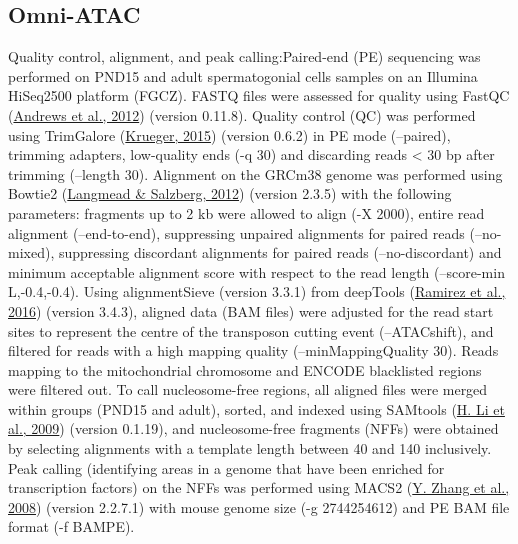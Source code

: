 \documentclass[12pt,twoside]{reedthesis}
\begin{document}
\hypertarget{omni-atac}{%
\subsection{Omni-ATAC}\label{omni-atac}}

Quality control, alignment, and peak calling:Paired-end (PE) sequencing
was performed on PND15 and adult spermatogonial cells samples on an
Illumina HiSeq2500 platform (FGCZ). FASTQ files were assessed for
quality using FastQC (\protect\hyperlink{ref-andrews2012}{Andrews et al., 2012}) (version 0.11.8). Quality control
(QC) was performed using TrimGalore (\protect\hyperlink{ref-krueger2015}{Krueger, 2015}) (version 0.6.2) in PE
mode (--paired), trimming adapters, low-quality ends (-q 30) and
discarding reads \textless{} 30 bp after trimming (--length 30). Alignment on the
GRCm38 genome was performed using Bowtie2 (\protect\hyperlink{ref-langmead2012}{Langmead \& Salzberg, 2012}) (version
2.3.5) with the following parameters: fragments up to 2 kb were allowed
to align (-X 2000), entire read alignment (--end-to-end), suppressing
unpaired alignments for paired reads (--no-mixed), suppressing
discordant alignments for paired reads (--no-discordant) and minimum
acceptable alignment score with respect to the read length (--score-min
L,-0.4,-0.4). Using alignmentSieve (version 3.3.1) from deepTools
(\protect\hyperlink{ref-ramirez2016}{Ramirez et al., 2016}) (version 3.4.3), aligned data (BAM files) were adjusted
for the read start sites to represent the centre of the transposon
cutting event (--ATACshift), and filtered for reads with a high mapping
quality (--minMappingQuality 30). Reads mapping to the mitochondrial
chromosome and ENCODE blacklisted regions were filtered out. To call
nucleosome-free regions, all aligned files were merged within groups
(PND15 and adult), sorted, and indexed using SAMtools (\protect\hyperlink{ref-li2009}{H. Li et al., 2009}) (version
0.1.19), and nucleosome-free fragments (NFFs) were obtained by selecting
alignments with a template length between 40 and 140 inclusively. Peak
calling (identifying areas in a genome that have been enriched for
transcription factors) on the NFFs was performed using MACS2
(\protect\hyperlink{ref-zhang2008}{Y. Zhang et al., 2008}) (version 2.2.7.1) with mouse genome size (-g 2744254612)
and PE BAM file format (-f BAMPE).
\end{document}
